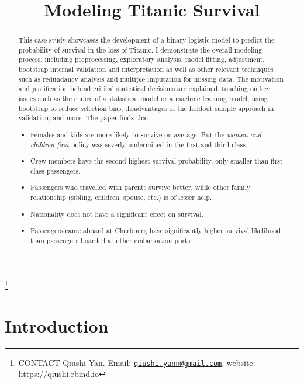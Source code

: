 \documentclass[]{interact}
\theoremstyle{plain}%
\theoremstyle{definition}
\theoremstyle{remark}
\begin{document}
\articletype{}

\title{Modeling Titanic Survival}


\author{
}

\thanks{CONTACT Qiushi Yan. Email: \href{mailto:qiushi.yann@gmail.com}{\nolinkurl{qiushi.yann@gmail.com}}, website: \url{https://qiushi.rbind.io}}

\maketitle

\begin{abstract}
This case study showcases the development of a binary logistic model to predict the probability of survival in the loss of Titanic. I demonstrate the overall modeling process, including preprocessing, exploratory analysis, model fitting, adjustment, bootstrap internal validation and interpretation as well as other relevant techniques such as redundancy analysis and multiple imputation for missing data. The motivation and justification behind critical statistical decisions are explained, touching on key issues such as the choice of a statistical model or a machine learning model, using bootstrap to reduce selection bias, disadvantages of the holdout sample approach in validation, and more. The paper finds that

\begin{itemize}
\item
  Females and kids are more likely to survive on average. But the \emph{women and children first} policy was severly undermined in the first and third class.
\item
  Crew members have the second highest survival probability, only smaller than first class passengers.
\item
  Passengers who travelled with parents survive better, while other family relationship (sibling, children, spouse, etc.) is of lesser help.
\item
  Nationality does not have a significant effect on survival.
\item
  Passengers came aboard at Cherbourg have significantly higher survival likelihood than passengers boarded at other embarkation ports.
\end{itemize}
\end{abstract}


\hypertarget{introduction}{%
\section{Introduction}\label{introduction}}
\end{document}
